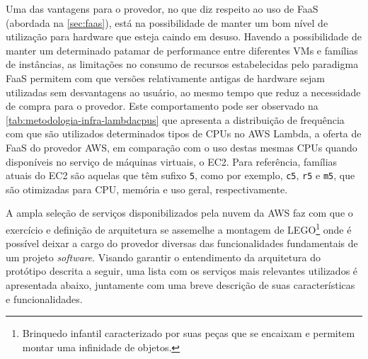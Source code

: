 \documentclass[english,brazilian]{UNISINOSmonografia} %
\begin{document}
Uma das vantagens para o provedor, no que diz respeito ao uso de FaaS (abordada na \autoref{sec:faas}), está na possibilidade de manter um bom nível de utilização para hardware que esteja caindo em desuso.
Havendo a possibilidade de manter um determinado patamar de performance entre diferentes VMs e famílias de instâncias, as limitações no consumo de recursos estabelecidas pelo paradigma FaaS permitem com que versões relativamente antigas de hardware sejam utilizadas sem desvantagens ao usuário, ao mesmo tempo que reduz a necessidade de compra para o provedor.
Este comportamento pode ser observado na \autoref{tab:metodologia-infra-lambdacpus} que apresenta a distribuição de frequência com que são utilizados determinados tipos de CPUs no AWS Lambda, a oferta de FaaS do provedor AWS, em comparação com o uso destas mesmas CPUs quando disponíveis no serviço de máquinas virtuais, o EC2.
Para referência, famílias atuais do EC2 são aquelas que têm sufixo \texttt{5}, como por exemplo, \texttt{c5}, \texttt{r5} e \texttt{m5}, que são otimizadas para CPU, memória e uso geral, respectivamente.



A ampla seleção de serviços disponibilizados pela nuvem da AWS faz com que o exercício e definição de arquitetura se assemelhe a montagem de LEGO\footnote{
	Brinquedo infantil caracterizado por suas peças que se encaixam e permitem montar uma infinidade de objetos.
}
onde é possível deixar a cargo do provedor diversas das funcionalidades fundamentais de um projeto \textit{software}.
Visando garantir o entendimento da arquitetura do protótipo descrita a seguir, uma lista com os serviços mais relevantes utilizados é apresentada abaixo, juntamente com uma breve descrição de suas características e funcionalidades.
\end{document}
